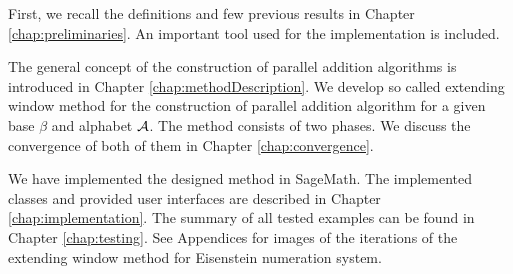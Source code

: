 First, we recall the definitions and few previous results in Chapter \ref{chap:preliminaries}. An important tool used for the implementation is included. 

The general concept of the construction of parallel addition algorithms is introduced in Chapter \ref{chap:methodDescription}. We develop so called extending window method for the construction of parallel addition algorithm for a given base $\beta$ and alphabet $\mathcal{A}$. The method consists of two phases. We discuss the convergence of both of them in Chapter \ref{chap:convergence}.

We have implemented the designed method in SageMath. The implemented classes and provided user interfaces are described in Chapter \ref{chap:implementation}. The summary of all tested examples can be found in Chapter \ref{chap:testing}. See Appendices for images of the iterations of the extending window method for Eisenstein numeration system.














